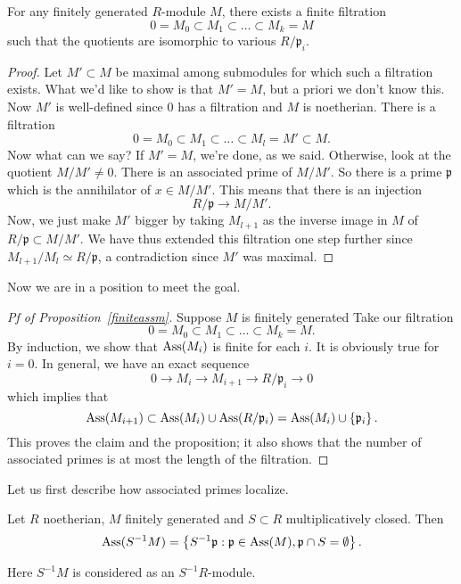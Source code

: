 \begin{proposition} \label{filtrationlemma}
For any finitely generated $R$-module $M$, there exists a finite filtration
\[ 0 = M_0 \subset M_1 \subset \dots \subset M_k = M  \]
such that the quotients are isomorphic to various $R/\mathfrak{p}_i$.
\end{proposition} 
\begin{proof} 
Let $M' \subset M$ be maximal among submodules for which such a filtration
exists. What we'd like to show is that $M' = M$, but a priori we don't know
this.  Now $M'$ is well-defined since $0$ has a filtration and $M$ is
noetherian.  There is a filtration
\[ 0 = M_0 \subset M_1 \subset \dots \subset M_l = M' \subset M.  \]
Now what can we say? If $M' = M$, we're done, as we said. Otherwise, look at
the quotient $M/M' \neq 0$. There is an associated prime of $M/M'$. So there is
a prime $\mathfrak{p}$ which is the annihilator of $x \in M/M'$. This means
that there is an injection 
\[ R/\mathfrak{p} \to M/M'.  \]
Now, we just make $M'$ bigger by taking $M_{l+1}$ as the inverse image in $M$
of $R/\mathfrak{p} \subset M/M'$. We have thus extended this filtration one
step further since $M_{l+1}/M_l \simeq R/\mathfrak{p}$, a contradiction since
$M'$ was maximal.
\end{proof} 

Now we are in a position to meet the goal. 
\begin{proof}[Pf of Proposition~\ref{finiteassm}]
Suppose $M$ is finitely generated Take our filtration
\[ 0 = M_0 \subset M_1 \subset \dots \subset M_k = M.  \]
By induction, we show that $\operatorname{Ass}(M_i)$ is finite for each $i$. It is obviously
true for $i=0$. In general, we have an exact sequence
\[ 0 \to M_i \to M_{i+1} \to R/\mathfrak{p}_i \to 0  \]
which implies that
\[ \operatorname{Ass}(M_{i+1}) \subset \operatorname{Ass}(M_i) \cup \operatorname{Ass}(R/\mathfrak{p}_i) = \operatorname{Ass}(M_i)
\cup \left\{\mathfrak{p}_i\right\} . \]
This proves the claim and the proposition; it also shows that the number of
associated primes is at most the length of the filtration. 

\end{proof} 



Let us first describe how associated primes localize.
\begin{proposition} 
Let $R$ noetherian, $M$ finitely generated and $S \subset R$ multiplicatively closed. 
Then 
\[ \operatorname{Ass}(S^{-1}M)  = \left\{S^{-1}\mathfrak{p}: \mathfrak{p} \in \operatorname{Ass}(M),
\mathfrak{p}\cap S  = \emptyset \right\} . \]
\end{proposition} 
Here $S^{-1}M$ is considered as an $S^{-1}R$-module.

